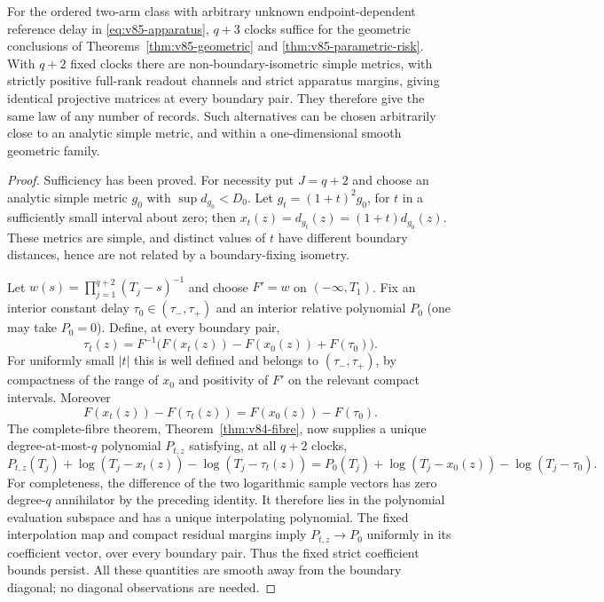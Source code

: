 \begin{theorem}
\label{thm:v85-geometric-clock}
For the ordered two-arm class with arbitrary unknown endpoint-dependent
reference delay in \eqref{eq:v85-apparatus}, $q+3$ clocks suffice for
the geometric conclusions of Theorems~\ref{thm:v85-geometric} and
\ref{thm:v85-parametric-risk}. With $q+2$ fixed clocks there are
non-boundary-isometric simple metrics, with strictly positive full-rank
readout channels and strict apparatus margins, giving identical
projective matrices at every boundary pair. They therefore give the
same law of any number of records. Such alternatives can be chosen
arbitrarily close to an analytic simple metric, and within a
one-dimensional smooth geometric family.
\end{theorem}
\begin{proof}
Sufficiency has been proved. For necessity put $J=q+2$ and choose an
analytic simple metric $g_0$ with $\sup d_{g_0}<D_0$. Let
$g_t=(1+t)^2g_0$, for $t$ in a sufficiently small interval about zero;
then $x_t(z)=d_{g_t}(z)=(1+t)d_{g_0}(z)$. These metrics are simple,
and distinct values of $t$ have different boundary distances, hence
are not related by a boundary-fixing isometry.

Let $w(s)=\prod_{j=1}^{q+2}(T_j-s)^{-1}$ and choose $F'=w$ on
$(-\infty,T_1)$. Fix an interior constant delay
$\tau_0\in(\tau_-,\tau_+)$ and an interior relative polynomial
$P_0$ (one may take $P_0=0$). Define, at every boundary pair,
\begin{equation}\label{eq:v85-geometric-fibre}
 \tau_t(z)=F^{-1}\bigl(F(x_t(z))-F(x_0(z))+F(\tau_0)\bigr).
\end{equation}
For uniformly small $|t|$ this is well defined and belongs to
$(\tau_-,\tau_+)$, by compactness of the range of $x_0$ and positivity
of $F'$ on the relevant compact intervals. Moreover
\[
           F(x_t(z))-F(\tau_t(z))=F(x_0(z))-F(\tau_0).
\]
The complete-fibre theorem, Theorem~\ref{thm:v84-fibre}, now supplies
a unique degree-at-most-$q$ polynomial $P_{t,z}$ satisfying, at all
$q+2$ clocks,
\begin{equation}\label{eq:v85-identical-geometric-ratios}
 P_{t,z}(T_j)+\log(T_j-x_t(z))-\log(T_j-\tau_t(z))
       =P_0(T_j)+\log(T_j-x_0(z))-\log(T_j-\tau_0).
\end{equation}
For completeness, the difference of the two logarithmic sample
vectors has zero degree-$q$ annihilator by the preceding identity.
It therefore lies in the polynomial evaluation subspace and has a
unique interpolating polynomial. The fixed interpolation map and
compact residual margins imply $P_{t,z}\to P_0$ uniformly in its
coefficient vector, over every boundary pair. Thus the fixed strict
coefficient bounds persist. All these quantities are smooth away
from the boundary diagonal; no diagonal observations are needed.


\end{proof}
